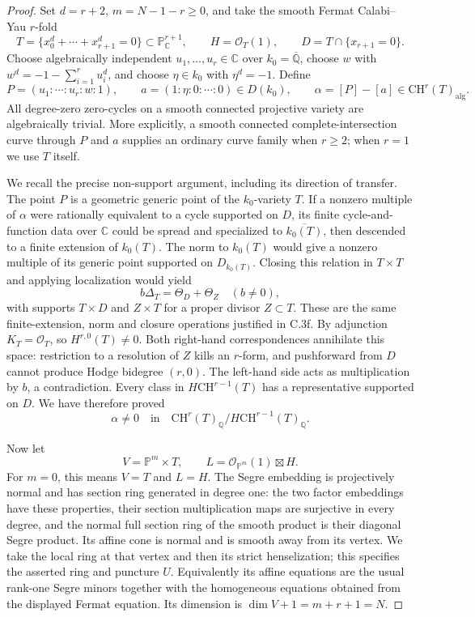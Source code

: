 \begin{proof}
Set $d=r+2$, $m=N-1-r\ge0$, and take the smooth Fermat
Calabi--Yau $r$-fold
\[
 T=\{x_0^d+\cdots+x_{r+1}^d=0\}\subset\mathbb P^{r+1}_{\mathbb C},
 \qquad H=\mathcal O_T(1),\qquad D=T\cap\{x_{r+1}=0\}.
\]
Choose algebraically independent
$u_1,\ldots,u_r\in\mathbb C$ over $k_0=\overline{\mathbb Q}$,
choose $w$ with $w^d=-1-\sum_{i=1}^r u_i^d$, and choose
$\eta\in k_0$ with $\eta^d=-1$. Define
\[
 P=(u_1:\cdots:u_r:w:1),\qquad
 a=(1:\eta:0:\cdots:0)\in D(k_0),\qquad
 \alpha=[P]-[a]\in\mathrm{CH}^r(T)_{\mathrm{alg}}.
\]
All degree-zero zero-cycles on a smooth connected projective
variety are algebraically trivial. More explicitly, a smooth
connected complete-intersection curve through $P$ and $a$
supplies an ordinary curve family when $r\ge2$; when $r=1$
we use $T$ itself.

We recall the precise non-support argument, including its
direction of transfer. The point $P$ is a geometric generic
point of the $k_0$-variety $T$. If a nonzero multiple of
$\alpha$ were rationally equivalent to a cycle supported on
$D$, its finite cycle-and-function data over $\mathbb C$
could be spread and specialized to $\overline{k_0(T)}$,
then descended to a finite extension of $k_0(T)$.
The norm to $k_0(T)$ would give a nonzero multiple of its
generic point supported on $D_{k_0(T)}$. Closing this relation
in $T\times T$ and applying localization would yield
\[
       b\Delta_T=\Theta_D+\Theta_Z\quad(b\ne0),
\]
with supports $T\times D$ and $Z\times T$ for a proper
divisor $Z\subset T$. These are the same finite-extension,
norm and closure operations justified in C.3f. By adjunction
$K_T=\mathcal O_T$, so $H^{r,0}(T)\ne0$. Both right-hand
correspondences annihilate this space: restriction to a
resolution of $Z$ kills an $r$-form, and pushforward from
$D$ cannot produce Hodge bidegree $(r,0)$. The left-hand
side acts as multiplication by $b$, a contradiction.
Every class in $H\mathrm{CH}^{r-1}(T)$ has a representative
supported on $D$. We have therefore proved
\begin{equation}\label{eq:C3-CY-quotient-nonzero}
  \alpha\ne0\quad\text{in}\quad
  \mathrm{CH}^r(T)_{\mathbb Q}/
                      H\mathrm{CH}^{r-1}(T)_{\mathbb Q}.
\end{equation}

Now let
\[
           V=\mathbb P^m\times T,\qquad
           L=\mathcal O_{\mathbb P^m}(1)\boxtimes H.
\]
For $m=0$, this means $V=T$ and $L=H$.
The Segre embedding is projectively normal and has section
ring generated in degree one: the two factor embeddings have
these properties, their section multiplication maps are
surjective in every degree, and the normal full section ring
of the smooth product is their diagonal Segre product.
Its affine cone is normal and is smooth away from its vertex.
We take the local ring at that vertex and then its strict
henselization; this specifies the asserted ring and puncture
$U$. Equivalently its affine equations are the usual rank-one
Segre minors together with the homogeneous equations obtained
from the displayed Fermat equation. Its dimension is
$\dim V+1=m+r+1=N$.


\end{proof}
